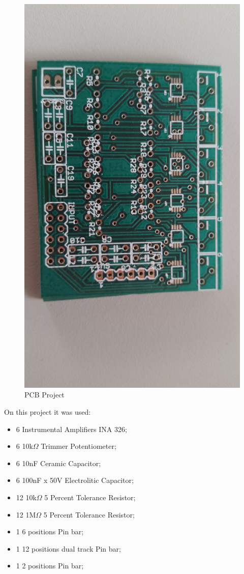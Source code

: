 \begin{figure}[!htpb]
\centering
\includegraphics[scale=0.08]{textual-elements/hardware/INA_board}
\caption{PCB Project}
\end{figure}

On this project it was used:

\begin{itemize}
\item 6 Instrumental Amplifiers INA 326;
\item 6 10k$\Omega$ Trimmer Potentiometer;
\item 6 10nF Ceramic Capacitor;
\item 6 100nF x 50V Electrolitic Capacitor;
\item 12 10k$\Omega$ 5 Percent Tolerance Resistor;
\item 12 1M$\Omega$ 5 Percent Tolerance Resistor;
\item 1 6 positions Pin bar;
\item 1 12 positions dual track Pin bar;
\item 1 2 positions Pin bar;
\end{itemize}  

